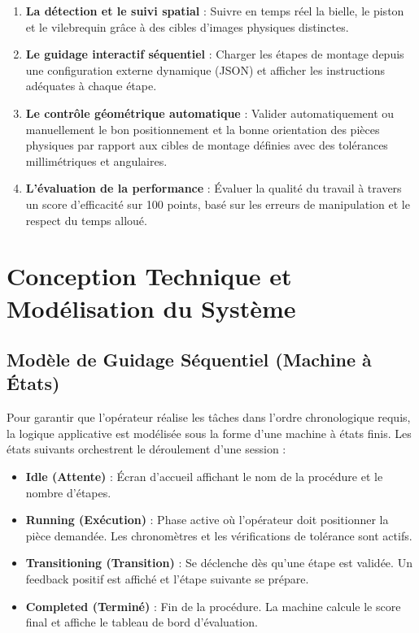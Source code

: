 \documentclass[12pt,a4paper]{article}
\begin{document}
\begin{enumerate}
    \item \textbf{La détection et le suivi spatial} : Suivre en temps réel la bielle, le piston et le vilebrequin grâce à des cibles d'images physiques distinctes.
    \item \textbf{Le guidage interactif séquentiel} : Charger les étapes de montage depuis une configuration externe dynamique (JSON) et afficher les instructions adéquates à chaque étape.
    \item \textbf{Le contrôle géométrique automatique} : Valider automatiquement ou manuellement le bon positionnement et la bonne orientation des pièces physiques par rapport aux cibles de montage définies avec des tolérances millimétriques et angulaires.
    \item \textbf{L'évaluation de la performance} : Évaluer la qualité du travail à travers un score d'efficacité sur 100 points, basé sur les erreurs de manipulation et le respect du temps alloué.
\end{enumerate}

\section{Conception Technique et Modélisation du Système}

\subsection{Modèle de Guidage Séquentiel (Machine à États)}
Pour garantir que l'opérateur réalise les tâches dans l'ordre chronologique requis, la logique applicative est modélisée sous la forme d'une machine à états finis. Les états suivants orchestrent le déroulement d'une session :
\begin{itemize}
    \item \textbf{Idle (Attente)} : Écran d'accueil affichant le nom de la procédure et le nombre d'étapes.
    \item \textbf{Running (Exécution)} : Phase active où l'opérateur doit positionner la pièce demandée. Les chronomètres et les vérifications de tolérance sont actifs.
    \item \textbf{Transitioning (Transition)} : Se déclenche dès qu'une étape est validée. Un feedback positif est affiché et l'étape suivante se prépare.
    \item \textbf{Completed (Terminé)} : Fin de la procédure. La machine calcule le score final et affiche le tableau de bord d'évaluation.
\end{itemize}
\end{document}
